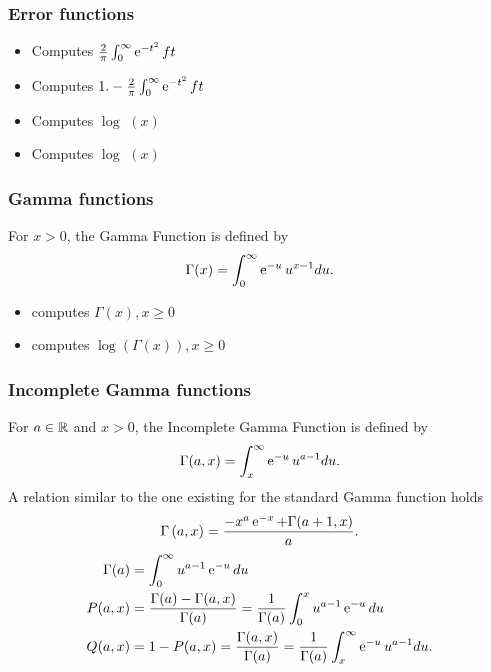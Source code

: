 \subsubsection{Error functions}

\begin{itemize}
\item {}
  \sshortdescribe Computes $\frac{2}{\pi}\int_0^\infty \operatorname{e}^{ -t^2 } ft$
\item {}
  \sshortdescribe Computes $1. - \frac{2}{\pi}\int_0^\infty \operatorname{e}^{ -t^2 } ft$
\item {}
  \sshortdescribe Computes $\log$ $(x)$
\item {}
  \sshortdescribe Computes $\log$ $(x)$
\end{itemize}

\subsubsection{Gamma functions}

For $x>0$, the Gamma Function is defined by
\begin{equation*}
  \Gamma(x)=\int_0^{\infty} \operatorname{e}^{ -u } u^{x-1} du.
\end{equation*}

\begin{itemize}
\item {}
  \sshortdescribe   computes $\Gamma(x), x \geq 0$
\item {}
  \sshortdescribe   computes $\log(\Gamma(x)), x \geq 0$
\end{itemize}

\subsubsection{Incomplete Gamma functions}

For $a \in {\mathbb R}$ and $x>0$, the Incomplete Gamma Function is defined by
\begin{equation*}
  \Gamma(a, x)=\int_x^{\infty} \operatorname{e}^{ -u } u^{a-1} du.
\end{equation*}
A relation similar to the one existing for the standard Gamma function holds
\begin{equation*}
  \Gamma\left( a, x \right)= \frac{- x^{a} \operatorname{e}^{ -x } + \Gamma (a+1, x)}{a}.
\end{equation*}
\begin{align*}
  \Gamma(a)&=\int_0^{\infty} u^{a-1} \operatorname{e}^{ -u }du\\ 
  P(a, x) &= \frac{\Gamma(a) - \Gamma(a, x)}{\Gamma(a)} =
  \frac{1}{\Gamma(a)} \int_0^x u^{a-1} \operatorname{e}^{ -u }  du\\ 
  Q(a, x) &= 1-P(a, x) =\frac{\Gamma(a, x)}{\Gamma(a)} =
  \frac{1}{\Gamma(a)} \int_x^{\infty} \operatorname{e}^{ -u } u^{a-1} du. 
\end{align*}

